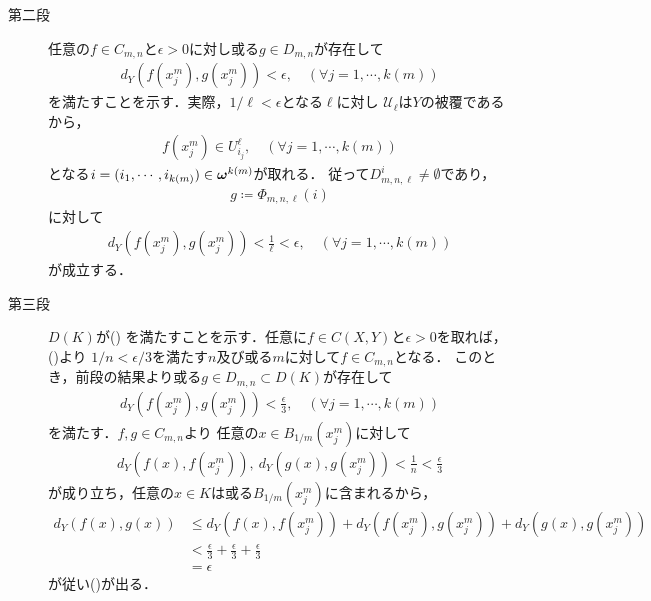 \begin{prf}
\begin{description}
			\item[第二段]
				任意の$f \in C_{m,n}$と$\epsilon > 0$に対し或る$g \in D_{m,n}$が存在して
				\begin{align}
					d_Y\left(f(x^m_j),g(x^m_j)\right) < \epsilon,
					\quad (\forall j=1,\cdots,k(m))
				\end{align}
				を満たすことを示す．実際，$1/\ell < \epsilon$となる$\ell$に対し
				$\mathscr{U}_\ell$は$Y$の被覆であるから，
				\begin{align}
					f(x^m_j) \in U^\ell_{i_j},
					\quad (\forall j=1,\cdots,k(m))
				\end{align}
				となる$i=(i_1,\cdots,i_{k(m)}) \in {\boldsymbol \omega}^{k(m)}$が取れる．
				従って$D^i_{m,n,\ell} \neq \emptyset$であり，
				\begin{align}
					g \coloneqq \Phi_{m,n,\ell}(i)
				\end{align}
				に対して
				\begin{align}
					d_Y\left(f(x^m_j),g(x^m_j)\right) < \frac{1}{\ell} < \epsilon,
					\quad (\forall j=1,\cdots,k(m))
				\end{align}
				が成立する．
				
			\item[第三段]
				$D(K)$が()
				を満たすことを示す．任意に$f \in C(X,Y)$と$\epsilon > 0$を取れば，
				()より
				$1/n < \epsilon/3$を満たす$n$及び或る$m$に対して$f \in C_{m,n}$となる．
				このとき，前段の結果より或る$g \in D_{m,n} \subset D(K)$が存在して
				\begin{align}
					d_Y\left(f(x^m_j),g(x^m_j)\right) < \frac{\epsilon}{3},
					\quad (\forall j=1,\cdots,k(m))
				\end{align}
				を満たす．$f,g \in C_{m,n}$より
				任意の$x \in B_{1/m}(x^m_j)$に対して
				\begin{align}
					d_Y\left(f(x),f(x^m_j)\right),\ d_Y\left(g(x),g(x^m_j)\right) < \frac{1}{n} < \frac{\epsilon}{3}
				\end{align}
				が成り立ち，任意の$x \in K$は或る$B_{1/m}(x^m_j)$に含まれるから，
				\begin{align}
					d_Y\left(f(x),g(x)\right)
					&\leq d_Y\left(f(x),f(x^m_j)\right) + d_Y\left(f(x^m_j),g(x^m_j)\right) + d_Y\left(g(x),g(x^m_j)\right) \\
					&< \frac{\epsilon}{3}+\frac{\epsilon}{3}+\frac{\epsilon}{3} \\
					&= \epsilon
				\end{align}
				が従い()が出る．
				

\end{description}
\end{prf}
